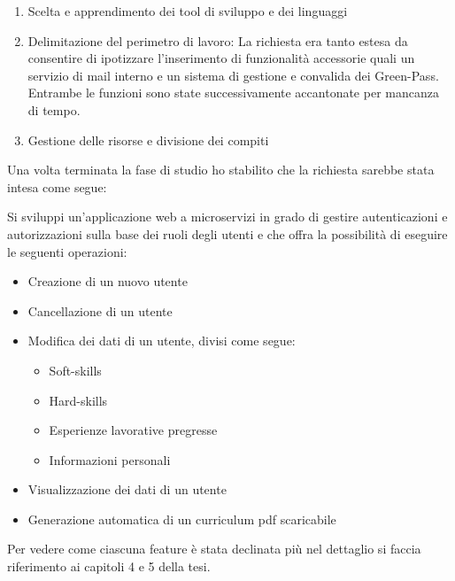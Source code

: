 \begin{enumerate}
    \item Scelta e apprendimento dei tool di sviluppo e dei linguaggi
    \item Delimitazione del perimetro di lavoro: La richiesta era tanto estesa da consentire di ipotizzare l'inserimento di funzionalità accessorie quali un servizio di mail interno e un sistema di gestione e convalida dei Green-Pass. Entrambe le funzioni sono state successivamente accantonate per mancanza di tempo.
    \item Gestione delle risorse e divisione dei compiti
\end{enumerate}
Una volta terminata la fase di studio ho stabilito che la richiesta sarebbe stata intesa come segue:
\begin{displayquote}
Si sviluppi un'applicazione web a microservizi in grado di gestire autenticazioni e autorizzazioni sulla base dei ruoli degli utenti e che offra la possibilità di eseguire le seguenti operazioni:
\begin{itemize}
    \item Creazione di un nuovo utente
    \item Cancellazione di un utente
    \item Modifica dei dati di un utente, divisi come segue:
    \begin{itemize}
        \item Soft-skills
        \item Hard-skills
        \item Esperienze lavorative pregresse
        \item Informazioni personali
    \end{itemize}
    \item Visualizzazione dei dati di un utente
    \item Generazione automatica di un curriculum pdf scaricabile
\end{itemize}
\end{displayquote}
Per vedere come ciascuna feature è stata declinata più nel dettaglio si faccia riferimento ai capitoli 4 e 5 della tesi.



